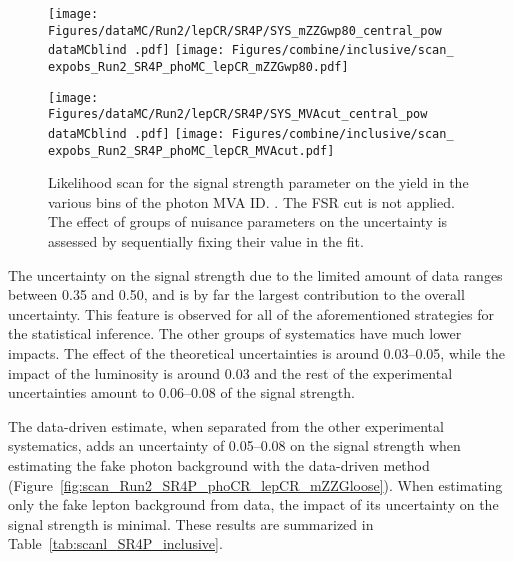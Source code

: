 \begin{figure}
  \texttt{[image: Figures/dataMC/Run2/lepCR/SR4P/SYS\_mZZGwp80\_central\_pow\\dataMCblind .pdf]}
  \hfill
  \centering
  \texttt{[image: Figures/combine/inclusive/scan\_\\expobs\_Run2\_SR4P\_phoMC\_lepCR\_mZZGwp80.pdf]}
  \caption{}
  \label{fig:scan_Run2_SR4P_phoMC_lepCR_mZZGwp80}
\end{figure}

\begin{figure}
  \centering
  \texttt{[image: Figures/dataMC/Run2/lepCR/SR4P/SYS\_MVAcut\_central\_pow\\dataMCblind .pdf]}
  \hfill
  \texttt{[image: Figures/combine/inclusive/scan\_\\expobs\_Run2\_SR4P\_phoMC\_lepCR\_MVAcut.pdf]}
  \caption{Likelihood scan for the signal strength parameter
    on the yield in the various bins of the photon MVA ID.
    .
    The FSR cut is not applied.
    The effect of groups of nuisance parameters on the uncertainty is assessed by sequentially fixing their value in the fit.
  }
  \label{fig:scan_Run2_SR4P_phoMC_lepCR_MVAcut}
\end{figure}

The uncertainty on the signal strength due to the limited amount of data ranges between 0.35 and 0.50,
and is by far the largest contribution to the overall uncertainty.
This feature is observed for all of the aforementioned strategies for the statistical inference.
The other groups of systematics have much lower impacts.
The effect of the theoretical uncertainties is around 0.03--0.05,
while the impact of the luminosity is around 0.03
and the rest of the experimental uncertainties amount to 0.06--0.08 of the signal strength.

The data-driven estimate, when separated from the other experimental systematics,
adds an uncertainty of 0.05--0.08 on the signal strength when estimating the fake photon background
with the data-driven method (Figure~\ref{fig:scan_Run2_SR4P_phoCR_lepCR_mZZGloose}).
When estimating only the fake lepton background from data, the impact of its uncertainty on the signal strength is minimal.
These results are summarized in Table~\ref{tab:scanl_SR4P_inclusive}.

